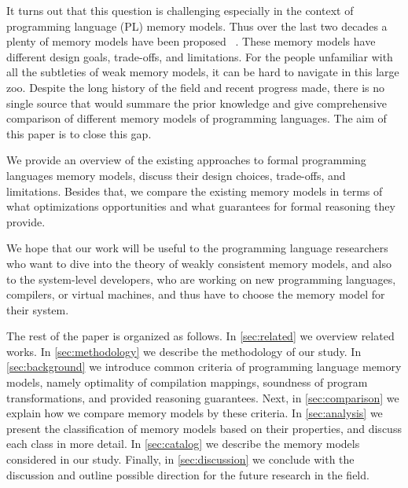 It turns out that this question is challenging
especially in the context of programming language (PL) memory models.
Thus over the last two decades a plenty of memory models have been proposed~%
\cite{Manson-al:POPL05, Batty-al:POPL11, Batty-al:POPL16, 
Dolan-al:PLDI18, Watt-al:OOPSLA19, Watt-al:PLDI2020, 
Jeffrey-Riely:LICS16, PichonPharabod-Sewell:POPL16, 
Podkopaev-al:CoRR16, Kang-al:POPL17, Chakraborty-Vafeiadis:POPL19, 
Paviotti-al:ESOP20, Lee-al:PLDI20}. 
These memory models have different design goals, trade-offs, and limitations.
For the people unfamiliar with all the subtleties 
of weak memory models, it can be hard to navigate in this large zoo.
Despite the long history of the field and recent progress made, 
there is no single source that would summare the prior knowledge
and give comprehensive comparison of different memory models
of programming languages. The aim of this paper is to close this gap.

We provide an overview of the existing approaches to 
formal programming languages memory models,
discuss their design choices, trade-offs, and limitations.
Besides that, we compare the existing memory models 
in terms of what optimizations opportunities 
and what guarantees for formal reasoning they provide.

We hope that our work will be useful to the programming language researchers 
who want to dive into the theory of weakly consistent memory models,
and also to the system-level developers, 
who are working on new programming languages, compilers, or virtual machines, 
and thus have to choose the memory model for their system.

The rest of the paper is organized as follows.
In \cref{sec:related} we overview related works. 
In \cref{sec:methodology} we describe the methodology 
of our study. In \cref{sec:background} we 
introduce common criteria of programming language memory models,
namely optimality of compilation mappings, 
soundness of program transformations, 
and provided reasoning guarantees.
Next, in \cref{sec:comparison} we explain 
how we compare memory models by these criteria.
In \cref{sec:analysis} we present the classification
of memory models based on their properties, 
and discuss each class in more detail. 
In \cref{sec:catalog} we describe 
the memory models considered in our study.
Finally, in \cref{sec:discussion} we conclude 
with the discussion and outline possible
direction for the future research in the field. 

